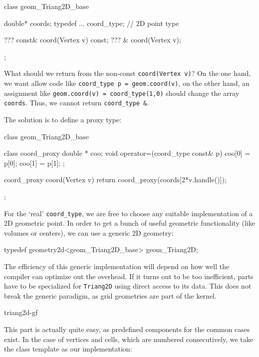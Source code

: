 \begin{example}
class geom_Triang2D_base {
   double* coords;
   typedef ... coord_type;  // 2D point type

   ??? const& coord(Vertex v) const;
   ???      & coord(Vertex v);
};
\end{example}

What should we return from 
the non-const \texttt{coord(Vertex v)}?
On the one hand, we want allow code like
\texttt{coord\_type p = geom.coord(v)},
on the other hand, an assignment like
\texttt{geom.coord(v) = coord\_type(1,0)} should change the
array \texttt{coords}.
Thus, we cannot return \texttt{coord\_type \&}.

The solution is to define a proxy type:

\begin{example}
class geom_Triang2D_base {

   class coord_proxy {
     double * coo;
     void operator=(coord_type const& p) 
     {  coo[0] = p[0]; coo[1] = p[1]; }
   };

   coord_proxy        coord(Vertex v) 
   { return coord_proxy(coords[2*v.handle()]);}
};
\end{example}


For the `real' \texttt{coord\_type}, 
we are free to choose any suitable implementation
of a 2D geometric point.
In order to get a bunch of useful geometric functionality
(like volumes or centers), 
we can use a generic 2D geometry:

\begin{example}
 typedef geometry2d<geom_Triang2D_base>  geom_Triang2D;
\end{example}

The efficiency of this generic implementation will depend
on how well the compiler can optimize out the overhead.
If it turns out to be too inefficient, 
parts have to be specialized for \texttt{Triang2D}
using direct  access to its data. 
This does not break the generic paradigm,
as grid geometries are part of the kernel.


\begin{Label}{triang2d-gf}
\end{Label}

This part is actually quite easy, as predefined components
for the common cases exist.
In the case of vertices and cells, which are
numbered consecutively, we take the class
template 
as our implementation:

